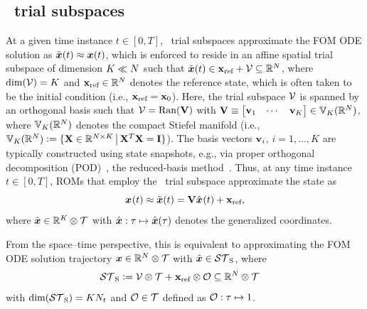 \documentclass[3p,computermodern,10pt]{elsarticle}
\begin{document}
\subsection{\spatialAcronym\ trial subspaces}
At a given time instance 
$t\in[0,T]$,
\spatialAcronym\ trial subspaces approximate the FOM ODE solution
	as $\tilde{\boldsymbol x}(t)\approx{\boldsymbol x}(t)$, which is enforced to reside in an
	affine spatial trial subspace of dimension $K\ll N$ such that
	$\tilde{\boldsymbol x}(t)\in
	\mathbf{x}_\text{ref}+\mathcal{V }
\subseteq\mathbb{R}^{N}$, where $\dim(\mathcal{V }) = K$
and $\mathbf{x}_\text{ref} \in \mathbb{R}^{N}$ denotes the reference state, which
	is often taken to be the initial condition (i.e., $\mathbf{x}_\text{ref} = {{\mathbf{x}}_0}$).
Here, the trial subspace
$\mathcal{V }$ 
is spanned by an orthogonal basis such that
$ \mathcal{V }= \mathrm{Ran}(\mathbf {V})$
with 
$ \mathbf {V} \equiv \begin{bmatrix}  \mathbf{v}_1  & \cdots &  \mathbf{v}_K \end{bmatrix}
	\in \mathbb{V}_{K}(\mathbb{R}^{N})$, where $\mathbb{V}_{K}(\mathbb{R}^{N})$ denotes the compact Stiefel manifold (i.e.,  $
	\mathbb{V}_{K}(\mathbb{R}^{N})\vcentcolon=
	\{ \mathbf{X} \in \mathbb{R}^{N
	\times K}\, \big|\, \mathbf{X}^T \mathbf{X} = \mathbf{I} \}$).
The basis vectors $\mathbf{v}_i$, $i=1,\ldots,K$ are typically constructed
using state snapshots, e.g., via
proper orthogonal decomposition (POD)~\cite{berkooz_turbulence_pod}, the reduced-basis method~\cite{rb_1,rb_2,rb_3,NgocCuong2005,Rozza2008}. 
Thus, at any time instance $t\in[0,T]$, ROMs that employ the  \spatialAcronym\ trial subspace approximate the state as
\begin{equation}\label{eq:affine_trialspace}
{\boldsymbol x}^{}(t) \approx \tilde{\boldsymbol x}(t) = \mathbf {V} \hat{ \boldsymbol x}^{}(t) + \mathbf{x}_\text{ref},
\end{equation}
where $\hat{ \boldsymbol x} \in \mathbb{R}^{K} \otimes \mathcal{T}$ with
$\hat{ \boldsymbol x}:\tau\mapsto\hat{ \boldsymbol x}(\tau)$
denotes the generalized
coordinates. 

	From the space--time perspective, this is equivalent to approximating the
	FOM ODE solution trajectory ${\boldsymbol x}\in\mathbb{R}^{N}\otimes\mathcal{T}$ with 
	$\tilde{\boldsymbol x}\in \mathcal{ ST }_{\text{S}}$, where
\begin{equation}\label{eq:spatial_subspace}
\begin{split}
& \mathcal{ ST }_{\text{S}} \vcentcolon= \mathcal{V } \otimes \mathcal{T} +
	\mathbf{x}_\text{ref}\otimes\mathcal{O}\subseteq\mathbb{R}^{N}\otimes\mathcal{T}
\end{split}
\end{equation}
with
	$\dim(\mathcal{ ST }_{\text{S}}) = KN_t$
and $\mathcal{O}\in\mathcal{T}$ defined as
$\mathcal{O}:\tau\mapsto 1$.
	 
\end{document}

